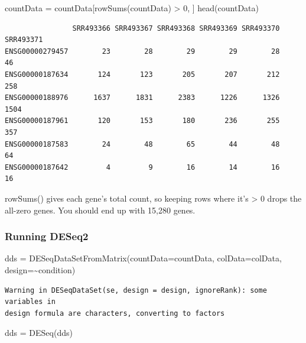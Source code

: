 \documentclass[
  letterpaper,
  DIV=11,
  numbers=noendperiod]{scrartcl}
\newenvironment{Shaded}{\begin{snugshade}}{\end{snugshade}}
\newcommand{\AttributeTok}[1]{\textcolor[rgb]{0.40,0.45,0.13}{#1}}
\newcommand{\DecValTok}[1]{\textcolor[rgb]{0.68,0.00,0.00}{#1}}
\newcommand{\FunctionTok}[1]{\textcolor[rgb]{0.28,0.35,0.67}{#1}}
\newcommand{\NormalTok}[1]{\textcolor[rgb]{0.00,0.23,0.31}{#1}}
\newcommand{\OtherTok}[1]{\textcolor[rgb]{0.00,0.23,0.31}{#1}}
\newcommand{\SpecialCharTok}[1]{\textcolor[rgb]{0.37,0.37,0.37}{#1}}
\begin{document}
\begin{Shaded}
\begin{Highlighting}[]
\NormalTok{countData }\OtherTok{=}\NormalTok{ countData[}\FunctionTok{rowSums}\NormalTok{(countData) }\SpecialCharTok{\textgreater{}} \DecValTok{0}\NormalTok{, ]}
\FunctionTok{head}\NormalTok{(countData)}
\end{Highlighting}
\end{Shaded}

\begin{verbatim}
                SRR493366 SRR493367 SRR493368 SRR493369 SRR493370 SRR493371
ENSG00000279457        23        28        29        29        28        46
ENSG00000187634       124       123       205       207       212       258
ENSG00000188976      1637      1831      2383      1226      1326      1504
ENSG00000187961       120       153       180       236       255       357
ENSG00000187583        24        48        65        44        48        64
ENSG00000187642         4         9        16        14        16        16
\end{verbatim}

rowSums() gives each gene's total count, so keeping rows where it's
\textgreater{} 0 drops the all-zero genes. You should end up with 15,280
genes.

\subsubsection{Running DESeq2}\label{running-deseq2}

\begin{Shaded}
\begin{Highlighting}[]
\NormalTok{dds }\OtherTok{=} \FunctionTok{DESeqDataSetFromMatrix}\NormalTok{(}\AttributeTok{countData=}\NormalTok{countData,}
                             \AttributeTok{colData=}\NormalTok{colData,}
                             \AttributeTok{design=}\SpecialCharTok{\textasciitilde{}}\NormalTok{condition)}
\end{Highlighting}
\end{Shaded}

\begin{verbatim}
Warning in DESeqDataSet(se, design = design, ignoreRank): some variables in
design formula are characters, converting to factors
\end{verbatim}

\begin{Shaded}
\begin{Highlighting}[]
\NormalTok{dds }\OtherTok{=} \FunctionTok{DESeq}\NormalTok{(dds)}
\end{Highlighting}
\end{Shaded}
\end{document}
